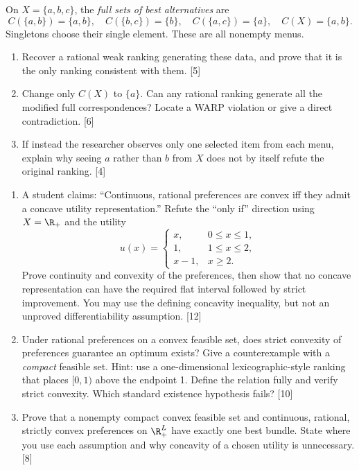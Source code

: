 On $X=\{a,b,c\}$, the \emph{full sets of best alternatives} are
\[
 C(\{a,b\})=\{a,b\},\quad C(\{b,c\})=\{b\},\quad C(\{a,c\})=\{a\},\quad C(X)=\{a,b\}.
\]
Singletons choose their single element. These are all nonempty menus.
\begin{enumerate}[label=(\alph*)]
\item Recover a rational weak ranking generating these data, and prove that it is the only ranking consistent with them. \hfill [5]
\item Change only $C(X)$ to $\{a\}$. Can any rational ranking generate all the modified full correspondences? Locate a WARP violation or give a direct contradiction. \hfill [6]
\item If instead the researcher observes only one selected item from each menu, explain why seeing $a$ rather than $b$ from $X$ does not by itself refute the original ranking. \hfill [4]
\end{enumerate}
\clearpage
{}
\begin{enumerate}[label=(\alph*)]
\item A student claims: ``Continuous, rational preferences are convex iff they admit a concave utility representation.'' Refute the ``only if'' direction using $X=\R_+$ and the utility
\[
 u(x)=\begin{cases}x,&0\le x\le1,\\1,&1\le x\le2,\\x-1,&x\ge2.\end{cases}
\]
Prove continuity and convexity of the preferences, then show that no concave representation can have the required flat interval followed by strict improvement. You may use the defining concavity inequality, but not an unproved differentiability assumption. \hfill [12]
\item Under rational preferences on a convex feasible set, does strict convexity of preferences guarantee an optimum exists? Give a counterexample with a \emph{compact} feasible set. Hint: use a one-dimensional lexicographic-style ranking that places $[0,1)$ above the endpoint 1. Define the relation fully and verify strict convexity. Which standard existence hypothesis fails? \hfill [10]
\item Prove that a nonempty compact convex feasible set and continuous, rational, strictly convex preferences on $\R_+^L$ have exactly one best bundle. State where you use each assumption and why concavity of a chosen utility is unnecessary. \hfill [8]
\end{enumerate}
